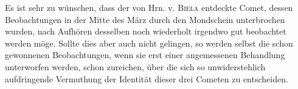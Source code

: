 Es ist sehr zu wünschen, dass der von Hrn. v. \textsc{Biela} entdeckte Comet, dessen
Beobachtungen in der Mitte des März durch den Mondschein unterbrochen wurden, nach
Aufhören desselben noch wiederholt irgendwo gut beobachtet werden möge. Sollte dies
aber auch nicht gelingen, so werden selbst die schon gewonnenen Beobachtungen, wenn
sie erst einer angemessenen Behandlung unterworfen werden, schon zureichen, über die
sich so unwiderstehlich aufdringende Vermuthung der Identität dieser drei Cometen zu
entscheiden.
